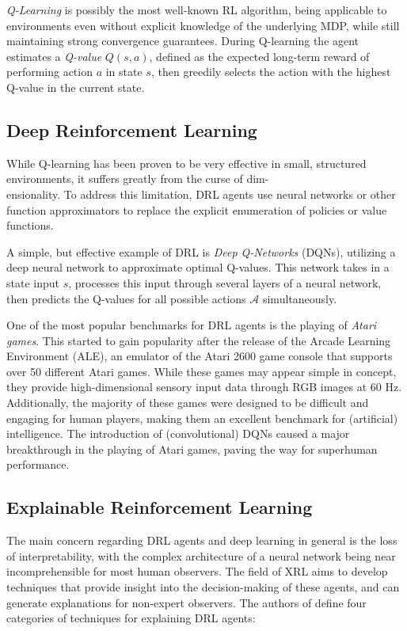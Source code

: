 \documentclass[sigconf]{acmart}
\begin{document}
\textit{Q-Learning} is possibly the most well-known RL algorithm, being applicable to environments even without explicit knowledge of the underlying MDP, while still maintaining strong convergence guarantees\cite{watkins1992q}.
During Q-learning the agent estimates a \textit{Q-value} $Q(s, a)$, defined as the expected long-term reward of performing action $a$ in state $s$, then greedily selects the action with the highest Q-value in the current state\cite{Cheng2025,watkins1992q}.

\subsection{Deep Reinforcement Learning}
While Q-learning has been proven to be very effective in small, structured environments, it suffers greatly from the curse of dim-\\ensionality\cite{Cheng2025}. %
To address this limitation, DRL agents use neural networks or other function approximators to replace the explicit enumeration of policies or value functions\cite{Cheng2025,mnih2015human}.

A simple, but effective example of DRL is \textit{Deep Q-Networks} (DQNs), utilizing a deep neural network to approximate optimal Q-values\cite{hosu2016playingatarigamesdeep,mnih2015human}.
This network takes in a state input $s$, processes this input through several layers of a neural network, then predicts the Q-values for all possible actions $\mathcal{A}$ simultaneously\cite{Cheng2025}.

One of the most popular benchmarks for DRL agents is the playing of \textit{Atari games}.
This started to gain popularity after the release of the Arcade Learning Environment (ALE), an emulator of the Atari 2600 game console that supports over 50 different Atari games\cite{hosu2016playingatarigamesdeep,bellemare2013arcade}.
While these games may appear simple in concept, they provide high-dimensional sensory input data through RGB images at 60 Hz.
Additionally, the majority of these games were designed to be difficult and engaging for human players, making them an excellent benchmark for (artificial) intelligence\cite{hosu2016playingatarigamesdeep,mnih2015human}.
The introduction of (convolutional) DQNs caused a major breakthrough in the playing of Atari games, paving the way for superhuman performance\cite{mnih2015human}.

\subsection{Explainable Reinforcement Learning}
The main concern regarding DRL agents and deep learning in general is the loss of interpretability, with the complex architecture of a neural network being near incomprehensible for most human observers\cite{li2018deepreinforcementlearningoverview,csahin2025unlocking}.
The field of XRL aims to develop techniques that provide insight into the decision-making of these agents, and can generate explanations for non-expert observers\cite{Cheng2025}.
The authors of \cite{Cheng2025} define four categories of techniques for explaining DRL agents:
\end{document}

